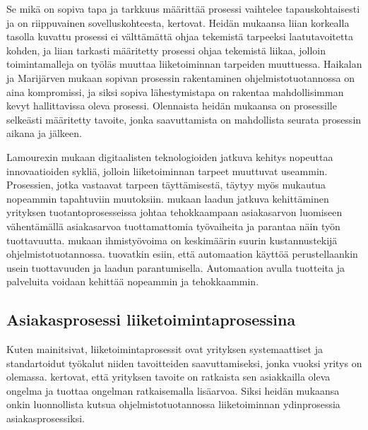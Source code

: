 \documentclass[finnish,12pt,a4paper,pdftex]{article}
\begin{document}
Se mikä on sopiva tapa ja tarkkuus määrittää prosessi vaihtelee tapauskohtaisesti ja on riippuvainen sovelluskohteesta, \cite{ohjelmistotuotanto} kertovat. Heidän mukaansa liian korkealla tasolla kuvattu prosessi ei välttämättä ohjaa tekemistä tarpeeksi laatutavoitetta kohden, ja liian tarkasti määritetty prosessi ohjaa tekemistä liikaa, jolloin toimintamalleja on työläs muuttaa liiketoiminnan tarpeiden muuttuessa. Haikalan ja Marijärven mukaan sopivan prosessin rakentaminen ohjelmistotuotannossa on aina kompromissi, ja siksi sopiva lähestymistapa on rakentaa mahdollisimman kevyt hallittavissa oleva prosessi. Olennaista heidän mukaansa on prosessille selkeästi määritetty tavoite, jonka saavuttamista on mahdollista seurata prosessin aikana ja jälkeen. 

Lamourexin \citeyearpar{lamoureux} mukaan digitaalisten teknologioiden jatkuva kehitys nopeuttaa innovaatioiden sykliä, jolloin liiketoiminnan tarpeet muuttuvat useammin. Prosessien, jotka vastaavat tarpeen täyttämisestä, täytyy myös mukautua nopeammin tapahtuviin muutoksiin. \cite{teollisuustalous} mukaan laadun jatkuva kehittäminen yrityksen tuotantoprosesseissa johtaa tehokkaampaan asiakasarvon luomiseen vähentämällä asiakasarvoa tuottamattomia työvaiheita ja parantaa näin työn tuottavuutta. \cite{ohjelmistotuotanto} mukaan ihmistyövoima on keskimäärin suurin kustannustekijä ohjelmistotuotannossa. \cite{teollisuustalous} tuovatkin esiin, että automaation käyttöä perustellaankin usein tuottavuuden ja laadun parantumisella. Automaation avulla tuotteita ja palveluita voidaan kehittää nopeammin ja tehokkaammin.

\subsection{Asiakasprosessi liiketoimintaprosessina}

Kuten \cite{teollisuustalous} mainitsivat, liiketoimintaprosessit ovat yrityksen systemaattiset ja standartoidut työkalut niiden tavoitteiden saavuttamiseksi, jonka vuoksi yritys on olemassa. \cite{ohjelmistotuotanto} kertovat, että yrityksen tavoite on ratkaista sen asiakkailla oleva ongelma ja tuottaa ongelman ratkaisemalla lisäarvoa. Siksi heidän mukaansa onkin luonnollista kutsua ohjelmistotuotannossa liiketoiminnan ydinprosessia asiakasprosessiksi.
\end{document}
